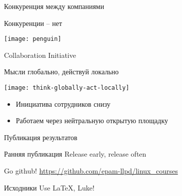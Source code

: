 \begin{frame}{Конкуренция между компаниями}

  \center\Large\alert{Конкуренции -- нет}

  \center\texttt{[image: penguin]}

\end{frame}


\begin{frame}{Collaboration Initiative}

  \begin{center}
    Мысли глобально, действуй локально

    \texttt{[image: think-globally-act-locally]}

    \begin{itemize}
      \item Инициатива сотрудников снизу
      \item Работаем через нейтральную открытую площадку
    \end{itemize}

  \end{center}

\end{frame}
\begin{frame}{Публикация результатов}

  \begin{center}
	  \begin{block}{Ранняя публикация}
		  {\Large Release early, release often}
	  \end{block}


	  \begin{block}{Go github!}
		\href{https://github.com/epam-llpd/linux\_courses}{https://github.com/epam-llpd/linux\_courses}
	  \end{block}


	  \begin{block}{Исходники}
		{\Large Use \LaTeX, Luke!}
	  \end{block}

  \end{center}

\end{frame}

